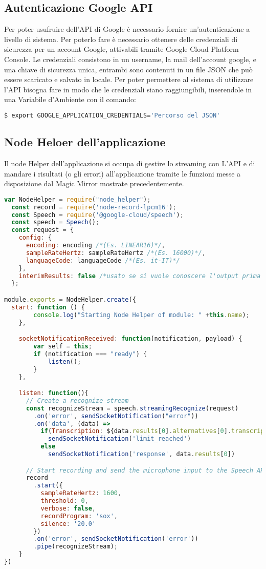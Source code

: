 \subsection{Autenticazione Google API}
Per poter usufruire dell'API di Google è necessario fornire un'autenticazione a livello
di sistema.
Per poterlo fare è necessario ottenere delle credenziali di sicurezza per un account Google,
attivabili tramite Google Cloud Platform Console.
Le credenziali consistono in un username, la mail dell'account google, e una chiave di sicurezza unica,
entrambi sono contenuti in un file JSON che può essere scaricato e salvato in locale.
Per poter permettere al sistema di utilizzare l'API bisogna fare in modo che le credenziali siano
raggiungibili, inserendole in una Variabile d'Ambiente con il comando:
\begin{lstlisting}[language=bash]
  $ export GOOGLE_APPLICATION_CREDENTIALS='Percorso del JSON'
\end{lstlisting}

\subsection{Node Heloer dell'applicazione}
Il node Helper dell'applicazione si occupa di gestire lo streaming con L'API e
di mandare i risultati (o gli errori) all'applicazione tramite le funzioni messe
a disposizione dal Magic Mirror mostrate precedentemente.

\begin{lstlisting}[language=Javascript]
  var NodeHelper = require("node_helper");
  const record = require('node-record-lpcm16');
  const Speech = require('@google-cloud/speech');
  const speech = Speech();
  const request = {
    config: {
      encoding: encoding /*(Es. LINEAR16)*/,
      sampleRateHertz: sampleRateHertz /*(Es. 16000)*/,
      languageCode: languageCode /*(Es. it-IT)*/
    },
    interimResults: false /*usato se si vuole conoscere l'output prima dell'elaborazione*/
  };

module.exports = NodeHelper.create({
  start: function () {
        console.log("Starting Node Helper of module: " +this.name);
    },

    socketNotificationReceived: function(notification, payload) {
        var self = this;
        if (notification === "ready") {
            listen();
        }
    },

    listen: function(){
      // Create a recognize stream
      const recognizeStream = speech.streamingRecognize(request)
        .on('error', sendSocketNotification("error"))
        .on('data', (data) =>
          if(Transcription: ${data.results[0].alternatives[0].transcript}\n)
            sendSocketNotification('limit_reached')
          else
            sendSocketNotification('response', data.results[0])

      // Start recording and send the microphone input to the Speech API
      record
        .start({
          sampleRateHertz: 1600,
          threshold: 0,
          verbose: false,
          recordProgram: 'sox',
          silence: '20.0'
        })
        .on('error', sendSocketNotification('error'))
        .pipe(recognizeStream);
    }
})
\end{lstlisting}

